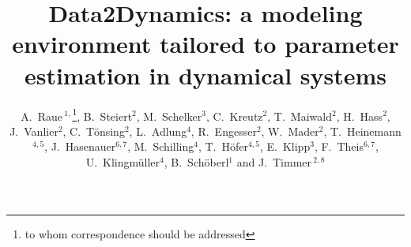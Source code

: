\documentclass{bioinfo}
\begin{document}

\title[Data2Dynamics]{Data2Dynamics: a modeling environment tailored to parameter 
estimation in dynamical systems}
\author[A.~Raue \textit{et~al.}]{
A.~Raue\,$^{1,}$\footnote{to whom correspondence 
should be addressed}, 
B.~Steiert$^{2}$, 
M.~Schelker$^{3}$, 
C.~Kreutz$^{2}$, 
T.~Maiwald$^{2}$, 
H.~Hass$^{2}$, 
J.~Vanlier$^{2}$, 
C.~T\"onsing$^{2}$, 
L.~Adlung$^{4}$, 
R.~Engesser$^{2}$, 
W.~Mader$^{2}$, 
T.~Heinemann$^{4,5}$, 
J.~Hasenauer$^{6,7}$, 
M.~Schilling$^{4}$, 
T.~H\"ofer$^{4,5}$, 
E.~Klipp$^{3}$, 
F.~Theis$^{6,7}$, 
U.~Klingm\"uller$^{4}$,
B.~Sch\"oberl$^{1}$ 
and J.~Timmer\,$^{2,8}$}
\address{$^{1}$Merrimack Pharmaceuticals Inc., 02139 Cambridge, MA, USA\\
$^{2}$University of Freiburg, Institute for Physics, 79104 Freiburg, Germany\\
$^{3}$Humboldt-Universit\"at zu Berlin, Theoretical Biophysics, 10115 Berlin, Germany\\
$^{4}$German Cancer Research Center, 69120 Heidelberg, Germany\\
$^{5}$BioQuant, University of Heidelberg, 69120 Heidelberg, Germany\\
$^{6}$Helmholtz Center Munich, 85764 Neuherberg, Germany\\
$^{7}$Technische Universit\"at M\"unchen, 85748 Garching, Germany \\
$^{8}$BIOSS Centre for Biological Signalling Studies, University of Freiburg, 79104 Freiburg, Germany}



\maketitle
\end{document}
